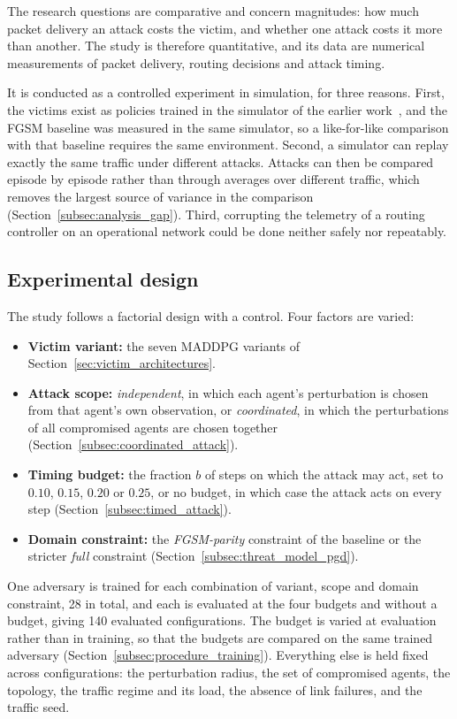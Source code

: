 The research questions are comparative and concern magnitudes: how much packet delivery
an attack costs the victim, and whether one attack costs it more than another. The study
is therefore quantitative, and its data are numerical measurements of packet delivery,
routing decisions and attack timing.

It is conducted as a controlled experiment in simulation, for three reasons. First, the
victims exist as policies trained in the simulator of the earlier
work~\cite{amaral2026maddpg-routing}, and the FGSM baseline was measured in the same
simulator, so a like-for-like comparison with that baseline requires the same
environment. Second, a simulator can replay exactly the same traffic under different
attacks. Attacks can then be compared episode by episode rather than through averages
over different traffic, which removes the largest source of variance in the comparison
(Section~\ref{subsec:analysis_gap}). Third, corrupting the telemetry of a routing
controller on an operational network could be done neither safely nor repeatably.

\subsection{Experimental design}
\label{subsec:experimental_design}

The study follows a factorial design with a control. Four factors are varied:
\begin{itemize}
  \item \textbf{Victim variant:} the seven MADDPG variants of
        Section~\ref{sec:victim_architectures}.
  \item \textbf{Attack scope:} \emph{independent}, in which each agent's perturbation
        is chosen from that agent's own observation, or \emph{coordinated}, in which the
        perturbations of all compromised agents are chosen together
        (Section~\ref{subsec:coordinated_attack}).
  \item \textbf{Timing budget:} the fraction $b$ of steps on which the attack may act,
        set to $0.10$, $0.15$, $0.20$ or $0.25$, or no budget, in which case the attack
        acts on every step (Section~\ref{subsec:timed_attack}).
  \item \textbf{Domain constraint:} the \emph{FGSM-parity} constraint of the baseline or
        the stricter \emph{full} constraint (Section~\ref{subsec:threat_model_pgd}).
\end{itemize}
One adversary is trained for each combination of variant, scope and domain constraint,
28 in total, and each is evaluated at the four budgets and without a budget, giving 140
evaluated configurations. The budget is varied at evaluation rather than in training, so
that the budgets are compared on the same trained adversary
(Section~\ref{subsec:procedure_training}). Everything else is held fixed across
configurations: the perturbation radius, the set of compromised agents, the topology, the
traffic regime and its load, the absence of link failures, and the traffic seed.

